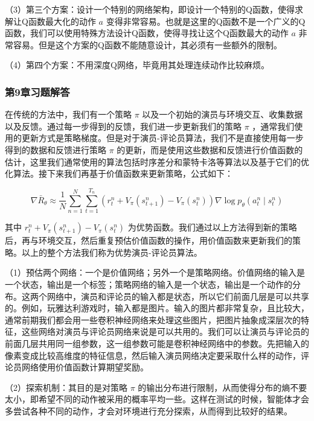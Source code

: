 （3）第三个方案：设计一个特别的网络架构，即设计一个特别的Q函数，使得求解让Q函数最大化的动作 $a$ 变得非常容易。也就是这里的Q函数不是一个广义的Q函数，我们可以使用特殊方法设计Q函数，使得寻找让这个Q函数最大的动作 $a$ 非常容易。但是这个方案的Q函数不能随意设计，其必须有一些额外的限制。

（4）第四个方案：不用深度Q网络，毕竟用其处理连续动作比较麻烦。



\subsubsection*{第9章习题解答}


在传统的方法中，我们有一个策略 $\pi$ 以及一个初始的演员与环境交互、收集数据以及反馈。通过每一步得到的反馈，我们进一步更新我们的策略 $\pi$ ，通常我们使用的更新方式是策略梯度。但是对于演员-评论员算法，我们不是直接使用每一步得到的数据和反馈进行策略 $\pi$ 的更新，而是使用这些数据和反馈进行价值函数的估计，这里我们通常使用的算法包括时序差分和蒙特卡洛等算法以及基于它们的优化算法。接下来我们再基于价值函数来更新策略，公式如下：

$$
\nabla \bar{R}_{\theta} \approx \frac{1}{N} \sum_{n=1}^{N} \sum_{t=1}^{T_{n}}\left(r_{t}^{n}+V_{\pi}\left(s_{t+1}^{n}\right)-V_{\pi}\left(s_{t}^{n}\right)\right) \nabla \log p_{\theta}\left(a_{t}^{n} \mid s_{t}^{n}\right)
$$

其中 $r_{t}^{n}+V_{\pi}\left(s_{t+1}^{n}\right)-V_{\pi}\left(s_{t}^{n}\right)$ 为优势函数。我们通过以上方法得到新的策略后，再与环境交互，然后重复预估价值函数的操作，用价值函数来更新我们的策略。以上的整个方法我们称为优势演员-评论员算法。


（1）预估两个网络：一个是价值网络；另外一个是策略网络。价值网络的输入是一个状态，输出是一个标签；策略网络的输入是一个状态，输出是一个动作的分布。这两个网络中，演员和评论员的输入都是状态，所以它们前面几层是可以共享的。例如，玩雅达利游戏时，输入都是图片。输入的图片都非常复杂，且比较大，通常前期我们都会用一些卷积神经网络来处理这些图片，把图片抽象成深层次的特征，这些网络对演员与评论员网络来说是可以共用的。我们可以让演员与评论员的前面几层共用同一组参数，这一组参数可能是卷积神经网络中的参数。先把输入的像素变成比较高维度的特征信息，然后输入演员网络决定要采取什么样的动作，评论员网络使用价值函数计算期望奖励。

（2）探索机制：其目的是对策略 $\pi$ 的输出分布进行限制，从而使得分布的熵不要太小，即希望不同的动作被采用的概率平均一些。这样在测试的时候，智能体才会多尝试各种不同的动作，才会对环境进行充分探索，从而得到比较好的结果。

